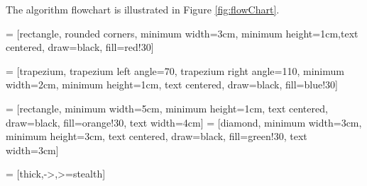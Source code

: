 \documentclass[preprint]{iucr}              %
\begin{document}
The algorithm flowchart is illustrated in Figure \ref{fig:flowChart}.


 = [rectangle, rounded corners, minimum width=3cm, minimum height=1cm,text centered, draw=black, fill=red!30]

 = [trapezium, trapezium left angle=70, trapezium right angle=110, minimum width=2cm, minimum height=1cm, text centered, draw=black, fill=blue!30]

 = [rectangle, minimum width=5cm, minimum height=1cm, text centered, draw=black, fill=orange!30, text width=4cm]
 = [diamond, minimum width=3cm, minimum height=3cm, text centered, draw=black, fill=green!30, text width=3cm]

 = [thick,->,>=stealth]
\end{document}
